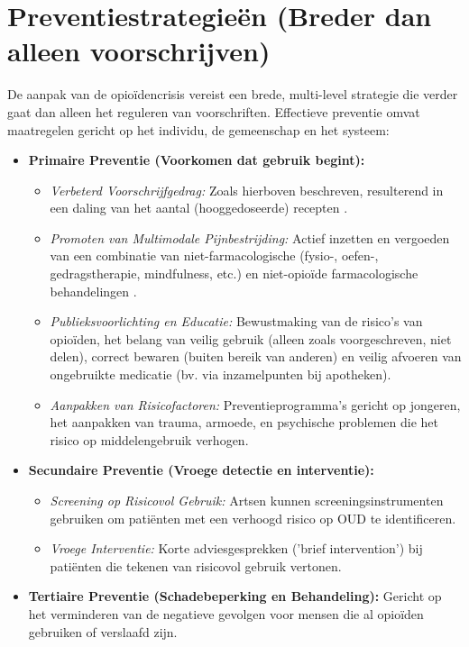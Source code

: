 \documentclass[11pt, a4paper]{report} %
\begin{document}
\section{Preventiestrategieën (Breder dan alleen voorschrijven)}
De aanpak van de opioïdencrisis vereist een brede, multi-level strategie die verder gaat dan alleen het reguleren van voorschriften. Effectieve preventie omvat maatregelen gericht op het individu, de gemeenschap en het systeem:
\begin{itemize}
    \item \textbf{Primaire Preventie (Voorkomen dat gebruik begint):}
        \begin{itemize}
            \item \textit{Verbeterd Voorschrijfgedrag:} Zoals hierboven beschreven, resulterend in een daling van het aantal (hooggedoseerde) recepten \parencite{CDCVitalSigns2017}.
            \item \textit{Promoten van Multimodale Pijnbestrijding:} Actief inzetten en vergoeden van een combinatie van niet-farmacologische (fysio-, oefen-, gedragstherapie, mindfulness, etc.) en niet-opioïde farmacologische behandelingen \parencite{MedlinePlusNonDrugPain}.
            \item \textit{Publieksvoorlichting en Educatie:} Bewustmaking van de risico's van opioïden, het belang van veilig gebruik (alleen zoals voorgeschreven, niet delen), correct bewaren (buiten bereik van anderen) en veilig afvoeren van ongebruikte medicatie (bv. via inzamelpunten bij apotheken).
            \item \textit{Aanpakken van Risicofactoren:} Preventieprogramma's gericht op jongeren, het aanpakken van trauma, armoede, en psychische problemen die het risico op middelengebruik verhogen.
        \end{itemize}
    \item \textbf{Secundaire Preventie (Vroege detectie en interventie):}
        \begin{itemize}
            \item \textit{Screening op Risicovol Gebruik:} Artsen kunnen screeningsinstrumenten gebruiken om patiënten met een verhoogd risico op OUD te identificeren.
            \item \textit{Vroege Interventie:} Korte adviesgesprekken ('brief intervention') bij patiënten die tekenen van risicovol gebruik vertonen.
        \end{itemize}
    \item \textbf{Tertiaire Preventie (Schadebeperking en Behandeling):} Gericht op het verminderen van de negatieve gevolgen voor mensen die al opioïden gebruiken of verslaafd zijn.

\end{itemize}
\end{document}
